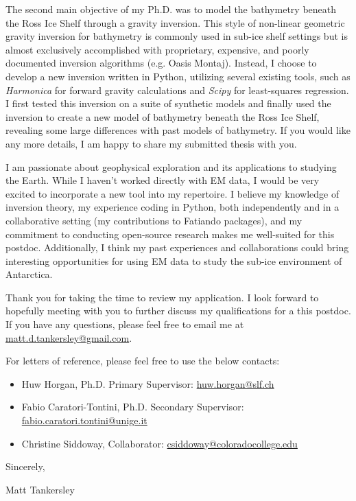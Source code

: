 \documentclass{ExpressiveCoverLetter}
\begin{document}
The second main objective of my Ph.D. was to model the bathymetry
beneath the Ross Ice Shelf through a gravity inversion. This style
of non-linear geometric gravity inversion for bathymetry is commonly
used in sub-ice shelf settings but is almost exclusively accomplished with
proprietary, expensive, and poorly documented inversion algorithms (e.g.
Oasis Montaj). Instead, I choose to develop a new inversion written in Python, utilizing several existing
tools, such as \textit{Harmonica} for forward gravity calculations and
\textit{Scipy} for least-squares regression.
I first tested this inversion on a suite of synthetic models and finally
used the inversion to create a new model of bathymetry beneath the Ross
Ice Shelf, revealing some large differences with past models of
bathymetry.
If you would like any more details, I am happy to share my submitted
thesis with you.

I am passionate about geophysical exploration and its applications to
studying the Earth. While I haven't worked directly with EM data, I
would be very excited to incorporate a new tool into my repertoire. I
believe my knowledge of inversion theory, my experience coding in
Python, both independently and in a collaborative setting (my
contributions to Fatiando packages), and my commitment to conducting open-source
research makes me well-suited for this postdoc. Additionally, I think my
past experiences and collaborations could bring interesting
opportunities for using EM data to study the sub-ice environment of Antarctica.


Thank you for taking the time to review my application. I look forward
to hopefully meeting with you to further discuss my
qualifications for a this postdoc. If you have any questions, please feel free to
email me at \href{mailto:matt.d.tankersley@gmail.com}{matt.d.tankersley@gmail.com}.


For letters of reference, please feel free to use the below contacts:
\begin{itemize}
    \item Huw Horgan, Ph.D. Primary Supervisor: \href{mailto:huw.horgan@slf.ch}{huw.horgan@slf.ch}
    \item Fabio Caratori-Tontini, Ph.D. Secondary Supervisor: \href{mailto:fabio.caratori.tontini@unige.it}{fabio.caratori.tontini@unige.it}
    \item Christine Siddoway, Collaborator: \href{mailto:csiddoway@coloradocollege.edu}{csiddoway@coloradocollege.edu}
\end{itemize}


Sincerely,

\vspace{.15in}

Matt Tankersley
\end{document}
